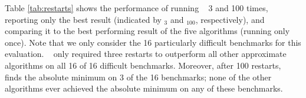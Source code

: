 \documentclass[preprint,11pt]{elsarticle}
\begin{document}
Table \ref{tab:restarts} shows the performance of running \FAQ~ 3 and 100 times, reporting only the best result (indicated by \FAQ$_3$ and \FAQ$_{100}$, respectively), and comparing it to the best performing result of the five algorithms (running only \FAQ~ once). Note that we only consider the 16 particularly difficult benchmarks for this evaluation. \FAQ~ only required three restarts to outperform all other approximate algorithms on all 16 of 16 difficult benchmarks.  Moreover, after 100 restarts, \FAQ~ finds the absolute minimum on 3 of the 16 benchmarks; none of the other algorithms ever achieved the absolute minimum on any of these benchmarks. 
\end{document}
